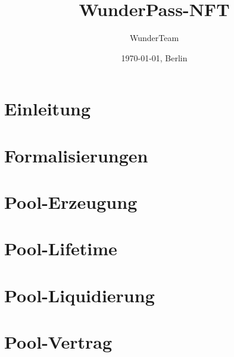 \documentclass[11pt]{scrartcl}
\title{WunderPass-NFT}
\author{WunderTeam}
\date{\today{}, Berlin}
\begin{document}
\maketitle
\tableofcontents{}

\newpage



\section{Einleitung}
\label{sec:pools-einleitung}
\vspace{0.3cm}


\section{Formalisierungen}
\vspace{0.3cm}


\section{Pool-Erzeugung}
\vspace{0.3cm}


\section{Pool-Lifetime}
\vspace{0.3cm}


\section{Pool-Liquidierung}
\label{sec:pools-liquidierung}
\vspace{0.3cm}


\section{Pool-Vertrag}
\vspace{0.3cm}
\end{document}
